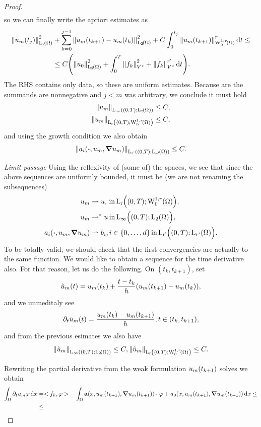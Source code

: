 \documentclass{article}
\begin{document}
\begin{proof}
\begin{align*}
	\end{align*}
	so we can finally write the apriori estimates as 
	\begin{align*}
		\norm{u_m\qty(t_j)}_{\LpSet[2]{\Omega}}^{2} &+ \sum_{k=0}^{j-1}\norm{u_m\qty(t_{k+1}) - u_m(t_k)}_{\LpSet[2]{\Omega}}^{2} + C\int_0^{t_j}\norm{u_m\qty(t_{k+1})}_{\WkpzeroSet[1][r]{\Omega}}^r \dd{t} \leq \\
	&\leq C\qty(\norm{u_0}_{\LpSet[2]{\Omega}}^{2} + \int_0^{T}\norm{f_k}_{V^{*}}^{2} + \norm{f_k}_{V^{*}}^{r'}\dd{t}).
	\end{align*}
	The RHS contains only data, so these are uniform estimates. Because are the summands are nonnegative and $j < m$ was arbitrary, we conclude it must hold
	\begin{align*}
		\NormLinfIntX{u_m}{0}{T}{\LpSet[2]{\Omega}} &\leq C, \\
		\NormLpIntX{u_m}{r}{0}{T}{\WkpzeroSet[1][r]{\Omega}} &\leq C, \\
	\end{align*}
	and using the growth condition we also obtain
	\[
		\NormLpIntX{a_i\qty(\vdot, u_m, \grad u_m)}{r'}{0}{T}{\LpSet[r']{\Omega}} \leq C.
	\]


	\textit{Limit passage}
	Using the reflexivity of (some of) the spaces, we see that since the above sequences are uniformly bounded, it must be (we are not renaming the subsequences)
	\begin{align*}
		u_m &\rightharpoonup u, \, \text{in} \, \LpIntX{r}{0}{T}{\WkpzeroSet[1][r]{\Omega}}, \\
		u_m &\rightharpoonup^* u \, \text{in} \, \LinfIntX{0}{T}{\LpSet[2]{\Omega}}, \\
		a_i\qty(\vdot, u_m, \grad u_m) &\rightharpoonup b_i , i \in \qty{0, \dots, d} \, \text{in} \, \LpIntX{r'}{0}{T}{\LpSet[r']{\Omega}}.
	\end{align*}
	To be totally valid, we should check that the first convergencies are actually to the same function. We would like to obtain a sequence for the time derivative also. For that reason, let us do the following. On $(t_k, t_{k+1})$, set
	\[
		\tilde{u}_m(t) = u_m\qty(t_k) + \frac{t-t_k}{h}\qty(u_m\qty(t_{k+1})-u_m(t_k)),
	\]
	and we immeditaly see
	\[
		\partial_t \tilde{u}_m(t) = \frac{u_m\qty(t_k) - u_m(t_{k+1})}{h},t \in (t_k, t_{k+1}),
	\]
	and from the previous esimates we also have
	\[
		\NormLinfIntX{\tilde{u}_m}{0}{T}{\LpSet[2]{\Omega}} \leq C,\NormLpIntX{\tilde{u}_m}{r}{0}{T}{\WkpzeroSet[1][r]{\Omega}} \leq C.
	\]
	
	Rewriting the partial derivative from the weak formulation $u_m\qty(t_{k+1})$ solves we obtain
	\begin{align*}
		\int_{\Omega}\partial_t \tilde{u}_m \varphi \dd{x} &= <f_k, \varphi> - \int_{\Omega}\vb{a}\qty(x, u_m\qty(t_{k+1}), \grad u_m\qty(t_{k+1}))\vdot \varphi + a_0\qty(x, u_m\qty(t_{k+1}), \grad u_m\qty(t_{k+1}))\dd{x} \leq \\
								   &\leq
	\end{align*}
	

\end{proof}
\end{document}
